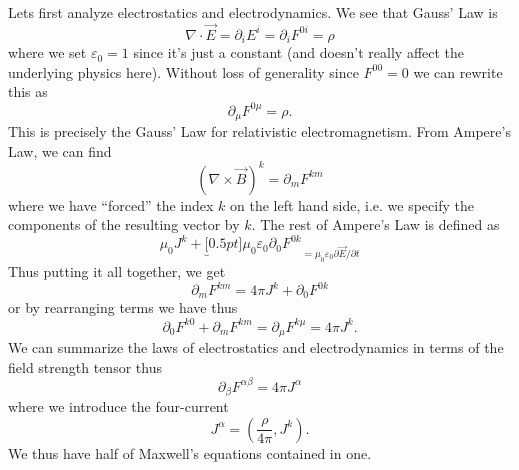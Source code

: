 Lets first analyze electrostatics and electrodynamics. We see that Gauss' Law is
\begin{equation}%
\nabla\cdot\vec{E} = \partial_{i}E^{i} = \partial_{i}F^{0i} = \rho
\end{equation}
where we set $\varepsilon_{0}=1$ since it's just a constant (and
doesn't really affect the underlying physics here). Without loss
of generality since $F^{00}=0$ we can rewrite this as
\begin{equation}%
\partial_{\mu}F^{0\mu} = \rho.
\end{equation}
This is precisely the Gauss' Law for relativistic
electromagnetism. From Ampere's Law, we can find
\begin{equation}%
(\nabla\times\vec{B})^{k} = \partial_{m}F^{km}
\end{equation}
where we have ``forced'' the index $k$ on the left hand side,
i.e. we specify the components of the resulting vector by
$k$. The rest of Ampere's Law is defined as
\begin{equation}%
\mu_{0}J^{k}+\underbracket[0.5pt]{\mu_{0}\varepsilon_{0}\partial_{0}F^{0k}}_{=\mu_{0}\varepsilon_{0}\partial\vec{E}/\partial{t}}
\end{equation}
Thus putting it all together, we get
\begin{equation}%
\partial_{m}F^{km} = 4\pi J^{k} + \partial_{0}F^{0k}
\end{equation}
or by rearranging terms we have thus
\begin{equation}%
\partial_{0}F^{k0}+\partial_{m}F^{km} = \partial_{\mu}F^{k\mu} = 4\pi J^{k}.
\end{equation}
We can summarize
the laws of electrostatics and electrodynamics in terms of the
field strength tensor thus
\begin{equation}%
\partial_{\beta}F^{\alpha\beta}=4\pi J^{\alpha}
\end{equation}
where we introduce the four-current
\begin{equation}%
J^{\alpha} = \left(\frac{\rho}{4\pi},J^{k}\right).
\end{equation}
We thus have half of Maxwell's equations contained in one.

